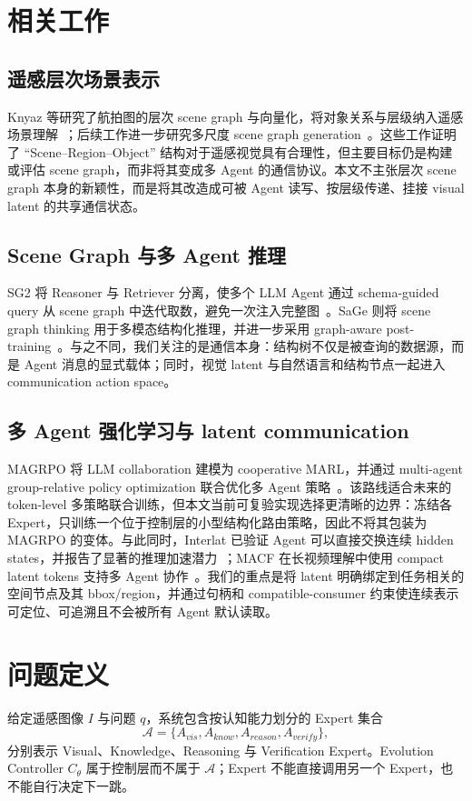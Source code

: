 \documentclass[10pt,a4paper,twocolumn]{ctexart}
\newcommand{\agentset}{\mathcal{A}}
\begin{document}
\section{相关工作}
\subsection{遥感层次场景表示}
Knyaz 等研究了航拍图的层次 scene graph 与向量化，将对象关系与层级纳入遥感场景理解~\cite{knyaz2025}；后续工作进一步研究多尺度 scene graph generation~\cite{knyaz2026}。这些工作证明了 ``Scene--Region--Object'' 结构对于遥感视觉具有合理性，但主要目标仍是构建或评估 scene graph，而非将其变成多 Agent 的通信协议。本文不主张层次 scene graph 本身的新颖性，而是将其改造成可被 Agent 读写、按层级传递、挂接 visual latent 的共享通信状态。

\subsection{Scene Graph 与多 Agent 推理}
SG2 将 Reasoner 与 Retriever 分离，使多个 LLM Agent 通过 schema-guided query 从 scene graph 中迭代取数，避免一次注入完整图~\cite{sg2}。SaGe 则将 scene graph thinking 用于多模态结构化推理，并进一步采用 graph-aware post-training~\cite{sage}。与之不同，我们关注的是通信本身：结构树不仅是被查询的数据源，而是 Agent 消息的显式载体；同时，视觉 latent 与自然语言和结构节点一起进入 communication action space。

\subsection{多 Agent 强化学习与 latent communication}
MAGRPO 将 LLM collaboration 建模为 cooperative MARL，并通过 multi-agent group-relative policy optimization 联合优化多 Agent 策略~\cite{magrpo}。该路线适合未来的 token-level 多策略联合训练，但本文当前可复验实现选择更清晰的边界：冻结各 Expert，只训练一个位于控制层的小型结构化路由策略，因此不将其包装为 MAGRPO 的变体。与此同时，Interlat 已验证 Agent 可以直接交换连续 hidden states，并报告了显著的推理加速潜力~\cite{interlat}；MACF 在长视频理解中使用 compact latent tokens 支持多 Agent 协作~\cite{macf}。我们的重点是将 latent 明确绑定到任务相关的空间节点及其 bbox/region，并通过句柄和 compatible-consumer 约束使连续表示可定位、可追溯且不会被所有 Agent 默认读取。

\section{问题定义}
给定遥感图像 $I$ 与问题 $q$，系统包含按认知能力划分的 Expert 集合
\begin{equation}
\agentset=\{A_{vis},A_{know},A_{reason},A_{verify}\},
\end{equation}
分别表示 Visual、Knowledge、Reasoning 与 Verification Expert。Evolution Controller $C_\theta$ 属于控制层而不属于 $\agentset$；Expert 不能直接调用另一个 Expert，也不能自行决定下一跳。
\end{document}
